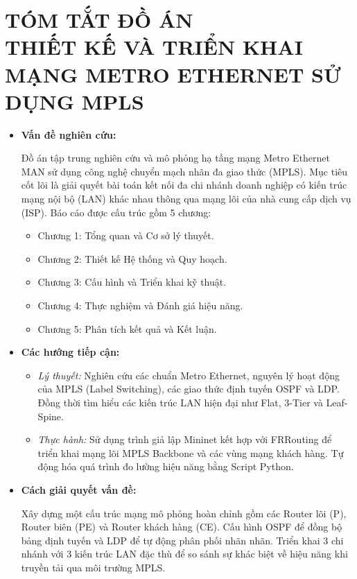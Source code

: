 \section*{TÓM TẮT ĐỒ ÁN\\THIẾT KẾ VÀ TRIỂN KHAI MẠNG METRO ETHERNET SỬ DỤNG MPLS}

\begin{itemize}
    \item \textbf{Vấn đề nghiên cứu:}
    
    Đồ án tập trung nghiên cứu và mô phỏng hạ tầng mạng Metro Ethernet MAN sử dụng công nghệ chuyển mạch nhãn đa giao thức (MPLS). Mục tiêu cốt lõi là giải quyết bài toán kết nối đa chi nhánh doanh nghiệp có kiến trúc mạng nội bộ (LAN) khác nhau thông qua mạng lõi của nhà cung cấp dịch vụ (ISP). Báo cáo được cấu trúc gồm 5 chương:
    
        \begin{itemize}
        \item[--] Chương 1: Tổng quan và Cơ sở lý thuyết.
        \item[--] Chương 2: Thiết kế Hệ thống và Quy hoạch.
        \item[--] Chương 3: Cấu hình và Triển khai kỹ thuật.
        \item[--] Chương 4: Thực nghiệm và Đánh giá hiệu năng.
        \item[--] Chương 5: Phân tích kết quả và Kết luận.
        \end{itemize}
        
    \item \textbf{Các hướng tiếp cận:}
    
        \begin{itemize}
        \item[--] \textit{Lý thuyết:} Nghiên cứu các chuẩn Metro Ethernet, nguyên lý hoạt động của MPLS (Label Switching), các giao thức định tuyến OSPF và LDP. Đồng thời tìm hiểu các kiến trúc LAN hiện đại như Flat, 3-Tier và Leaf-Spine.
        
        \item[--] \textit{Thực hành:} Sử dụng trình giả lập Mininet kết hợp với FRRouting để triển khai mạng lõi MPLS Backbone và các vùng mạng khách hàng. Tự động hóa quá trình đo lường hiệu năng bằng Script Python.
        \end{itemize}
        
    \item \textbf{Cách giải quyết vấn đề:}
    
    Xây dựng một cấu trúc mạng mô phỏng hoàn chỉnh gồm các Router lõi (P), Router biên (PE) và Router khách hàng (CE). Cấu hình OSPF để đồng bộ bảng định tuyến và LDP để tự động phân phối nhãn nhãn. Triển khai 3 chi nhánh với 3 kiến trúc LAN đặc thù để so sánh sự khác biệt về hiệu năng khi truyền tải qua môi trường MPLS.
    

\end{itemize}
